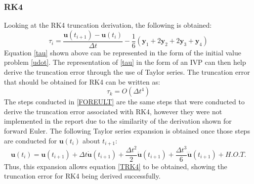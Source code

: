 \documentclass[conf]{new-aiaa}
\begin{document}
        \subsubsection{RK4}
        Looking at the RK4 truncation derivation, the following is obtained\cite{LecER}:
        \begin{equation}
            \tau_i = \frac{\bm{u}(t_{i+1}) - \bm{u}(t_i)}{\Delta t} - \frac{1}{6}(\bm{y}_1 + 2\bm{y}_2 + 2\bm{y}_3 + \bm{y}_4) \label{tau}
        \end{equation}
    Equation \eqref{tau} shown above can be represented in the form of the initial value problem \eqref{udot}. The representation of \eqref{tau} in the form of an IVP can then help derive the truncation error through the use of Taylor series. The truncation error that should be obtained for RK4 can be written as:
    \begin{equation}
        \tau_k = O(\Delta t^4) \label{TRK4}
    \end{equation}
    The steps conducted in \eqref{FOREULT} are the same steps that were conducted to derive the truncation error associated with RK4, however they were not implemented in the report due to the similarity of the derivation shown for forward Euler. The following Taylor series expansion is obtained once those steps are conducted for $\bm{u}(t_i)$ about $t_{i+1}$\cite{LecER}:
    \begin{equation}
        \bm{u}(t_i) = \bm{u}(t_{i+1}) + \Delta t\bm{\dot{u}}(t_{i+1}) + \frac{\Delta t^2}{2}\bm{\ddot{u}}(t_{i+1}) + \frac{\Delta t^3}{6}\bm{\dddot{u}}(t_{i+1}) + H.O.T. \label{TruncRK4}
    \end{equation}
    Thus, this expansion allows equation \eqref{TRK4} to be obtained, showing the truncation error for RK4 being derived successfully. 
\end{document}
